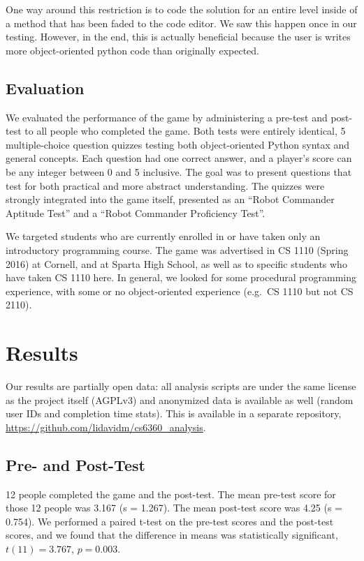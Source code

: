 \documentclass[12pt,notitlepage]{article}
\begin{document}
One way around this restriction is to code the solution for an entire
level inside of a method that has been faded to the code editor. We
saw this happen once in our testing. However, in the end, this is
actually beneficial because the user is writes more object-oriented
python code than originally expected.

\subsection{Evaluation}

We evaluated the performance of the game by administering a pre-test
and post-test to all people who completed the game. Both tests were
entirely identical, 5 multiple-choice question quizzes testing both
object-oriented Python syntax and general concepts. Each question had
one correct answer, and a player's score can be any integer between
0 and 5 inclusive. The goal was to present questions that test for both
practical and more abstract understanding. The quizzes were strongly
integrated into the game itself, presented as an
``Robot Commander Aptitude Test'' and a ``Robot Commander Proficiency
Test''.

We targeted students who are currently enrolled in or have taken only
an introductory programming course. The game was advertised in CS 1110
(Spring 2016) at Cornell, and at Sparta High School, as well as
to specific students who have taken CS 1110 here. In general, we
looked for some procedural programming experience, with some or no
object-oriented experience (e.g.\ CS 1110 but not CS 2110).

\section{Results}

Our results are partially open data: all analysis scripts are under
the same license as the project itself (AGPLv3) and anonymized data is
available as well (random user IDs and completion time stats). This is
available in a separate repository,
\url{https://github.com/lidavidm/cs6360_analysis}.

\subsection{Pre- and Post-Test}

12 people completed the game and the post-test. The mean pre-test score
for those 12 people was 3.167 (s = 1.267). The mean post-test score was
4.25 (s = 0.754). We performed a paired t-test on the pre-test scores and
the post-test scores, and we found that the difference in means was
statistically significant, $t(11) = 3.767$, $p = 0.003$.
\end{document}
